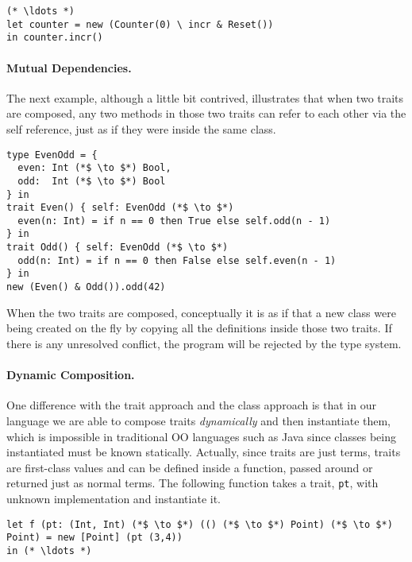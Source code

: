 \begin{lstlisting}
(* \ldots *)
let counter = new (Counter(0) \ incr & Reset())
in counter.incr()
\end{lstlisting}

\paragraph{Mutual Dependencies.}
The next example, although a little bit contrived, illustrates that when two
traits are composed, any two methods in those two traits can refer to each
other via the self reference, just as if they were inside the same class.

\begin{lstlisting}
type EvenOdd = {
  even: Int (*$ \to $*) Bool,
  odd:  Int (*$ \to $*) Bool
} in
trait Even() { self: EvenOdd (*$ \to $*)
  even(n: Int) = if n == 0 then True else self.odd(n - 1)
} in
trait Odd() { self: EvenOdd (*$ \to $*)
  odd(n: Int) = if n == 0 then False else self.even(n - 1)
} in
new (Even() & Odd()).odd(42)
\end{lstlisting}

When the two traits are composed, conceptually it is as if that a new class were
being created on the fly by copying all the definitions inside those two traits.
If there is any unresolved conflict, the program will be rejected by the type
system.

\paragraph{Dynamic Composition.}

One difference with the trait approach and the class approach is that in our
language we are able to compose traits \emph{dynamically} and then instantiate
them, which is impossible in traditional OO languages such as Java since classes
being instantiated must be known statically. Actually, since traits are just
terms, traits are first-class values and can be defined inside a function,
passed around or returned just as normal terms. The following function takes a
trait, \lstinline$pt$, with unknown implementation and instantiate it.

\begin{lstlisting}
let f (pt: (Int, Int) (*$ \to $*) (() (*$ \to $*) Point) (*$ \to $*) Point) = new [Point] (pt (3,4))
in (* \ldots *)
\end{lstlisting}

